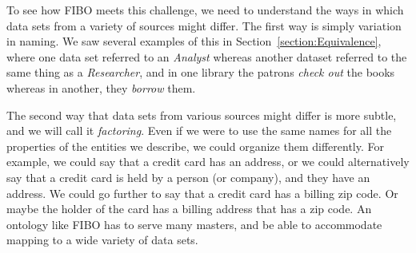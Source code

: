 To see how FIBO meets this challenge, we need to understand the ways in 
which data sets from a variety of sources might differ.  
The first way is simply variation in naming.    
We saw several examples of this in Section~\ref{section:Equivalence}, where one
data set referred to an \emph{Analyst} whereas another 
dataset referred to the same thing as a \emph{Researcher}, and in one 
library 
the patrons \emph{check out} the books whereas in another, 
they \emph{borrow} them.  

The second way that data sets from various sources might differ 
is more subtle, and we will call it \emph{factoring}.  
Even if we were to use the same names for all
the properties of the entities we describe, we could organize 
them differently.  For example, we could say that a credit card has
an address, or we could alternatively say that a credit card is 
held by a person (or company), and they have an address.  We could go further 
to say that a credit card has a billing zip code.  Or maybe the holder of 
the card has a billing address that has a zip code. 
An ontology like FIBO has to serve many masters, 
and be able to accommodate mapping to a wide variety of data sets. 

